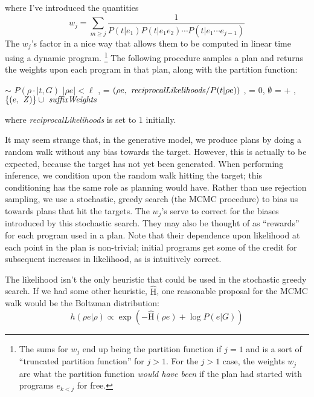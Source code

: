 \documentclass{article}
\begin{document}
where I've introduced the quantities
$$
w_j=\sum_{m\geq j} \frac{1}{P(t|e_1)P(t|e_1e_2)\cdots P(t|e_1\cdots e_{j-1})}
$$
The $w_j$'s factor in a nice way that allows them to be computed in linear time using a dynamic program.
\footnote{The sums for $w_j$ end up being the partition function if $j=1$ and is a sort of ``truncated partition function'' for $j>1$.
For the $j>1$ case, the weights $w_j$ are what the partition function \emph{would have been} if the plan had started with programs $e_{k<j}$ for free.}
The following procedure samples a plan and returns the weights upon each program in that plan, along with the partition function:
\begin{codebox}
\li {}
\li {} $\sim$ $P(\rho\cdot | t, G)$
\li {}
\li \If $|\rho e|<\ell$ \Then
\li {},  = $(\rho e, \mbox{\id{reciprocalLikelihoods}}/P(t|\rho e))$
\li \Else
\li {},  = $0$, $\emptyset$
\li \End
\li {} =  + 
\li \Return {}, $\{(e, \mbox{\id{Z}})\}\cup \mbox{\id{suffixWeights}}$
\end{codebox}
where \emph{reciprocalLikelihoods} is set to $1$ initially.

It may seem strange that, in the generative model, we produce plans by doing a random walk without any bias towards the target.
However, this is actually to be expected, because the target has not yet been generated.
When performing inference, we condition upon the random walk hitting the target; this conditioning has the same role as planning would have.
Rather than use rejection sampling, we use a stochastic, greedy search (the MCMC procedure) to bias us towards plans that hit the targets.
The $w_j$'s serve to correct for the biases introduced by this stochastic search.
They may also be thought of as ``rewards'' for each program used in a plan.
Note that their dependence upon likelihood at each point in the plan is non-trivial; initial programs get some of the credit for subsequent increases in likelihood, as is intuitively correct.

The likelihood isn't the only heuristic that could be used in the stochastic greedy search.
If we had some other heuristic, $\hat{\mbox{H}}$, one reasonable proposal for the MCMC walk would be the Boltzman distribution:
$$
h(\rho e | \rho) \propto \exp\left(-\hat{\mbox{H}}(\rho e) + \log P(e|G)\right)
$$
\end{document}
